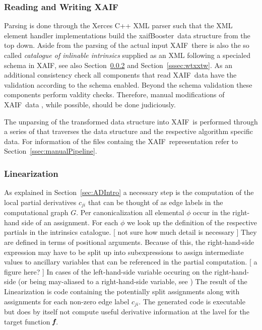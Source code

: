 \documentclass[acmtocl,acmnow]{acmtrans2m}
\newcommand{\xaif}{XAIF}
\newcommand{\xaifBooster}{xaifBooster}
\newcommand{\bmf}{\mbox{\bf\em f}}
\newcommand{\refsec}[1]{Section~\ref{#1}}
\begin{document}
\subsubsection{Reading and Writing \xaif}
Parsing is done through the Xerces C++ XML parser \cite{xercesWeb}
such that the XML element handler implementations build the \xaifBooster\ data 
structure 
from the top down. 
Aside from the parsing of the actual input \xaif\ there is also the so called 
{\em 
catalogue of inlinable intrinsics
} 
supplied as an XML following a specialed schema in \xaif, see also 
\refsec{sssec:linearization} and \refsec{sssec:wtxxtw}.
As an additional consistency check all components that read \xaif\ data 
have the validation according to the schema enabled. Beyond the schema 
validation these components perform valdity checks. Therefore, 
manual modifications of \xaif\ data , while possible, should 
be done judiciously. 

The unparsing of the transformed data structure into \xaif\ is performed 
through a series of that traverses the data structure and the 
respective algorithm specific data. 
For information of the files containg the \xaif\ representation refer to 
\refsec{ssec:manualPipeline}.

\subsubsection{Linearization}\label{sssec:linearization}

As explained in \refsec{sec:ADIntro} a necessary step is the computation of 
the local partial derivatives $c_{ji}$ that can be thought of as edge labels 
in the computational graph $G$. Per canonicalization all elemental $\phi$ 
occur in the right-hand side of an assignment. 
For each $\phi$ we look up the definition of the respective partials in 
the intrinsics catalogue. 
{\color{Red} [ not sure  how much detail is necessary ] } 
They are defined in terms of positional arguments. Because of this, 
the right-hand-side expression may have to be split up into 
subexpressions to assign intermediate values to ancillary variables 
that can be referenced in the partial computation.  
{\color{Red} [ a figure here? ] }
In cases of the left-hand-side variable occuring on the right-hand-side (or being 
may-aliased to a right-hand-side variable, see )
The result of the Linearization is code containing the potentially split 
assignments along with assignments for each non-zero edge label $c_{ji}$.
The generated code is executable but does by itself not compute useful 
derivative information at the lavel for the target function $\bmf$.
 
\end{document}
